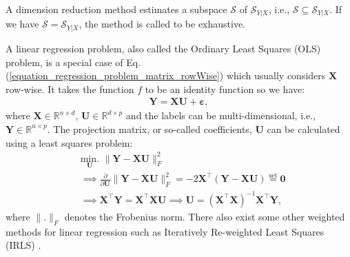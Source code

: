 \documentclass[lang=cn,10pt]{gorgeousnbook}
\numberwithin{equation}{section}%
\numberwithin{figure}{section}%
\begin{document}
\begin{definition}\label{definition_exhaustive_method}
A dimension reduction method estimates a subspace $\mathcal{S}$ of $\mathcal{S}_{Y|X}$, i.e., $\mathcal{S} \subseteq \mathcal{S}_{Y|X}$. If we have $\mathcal{S} = \mathcal{S}_{Y|X}$, the method is called to be exhaustive.
\end{definition}

\begin{definition}\label{definition_linear_regression}
A linear regression problem, also called the Ordinary Least Squares (OLS) problem, is a special case of Eq. (\ref{equation_regression_problem_matrix_rowWise}) which usually considers $\boldsymbol{X}$ row-wise. It takes the function $f$ to be an identity function so we have:
\begin{align*}
\boldsymbol{Y} = \boldsymbol{X} \boldsymbol{U} + \boldsymbol{\varepsilon},
\end{align*}
where $\boldsymbol{X} \in \mathbb{R}^{n \times d}$, $\boldsymbol{U} \in \mathbb{R}^{d \times p}$ and the labels can be multi-dimensional, i.e., $\boldsymbol{Y} \in \mathbb{R}^{n \times p}$. 
The projection matrix, or so-called coefficients, $\boldsymbol{U}$ can be calculated using a least squares problem:
\begin{align}
&\underset{\boldsymbol{U}}{\text{min.}}\,\, \|\boldsymbol{Y} - \boldsymbol{X} \boldsymbol{U}\|_F^2 \nonumber\\
&\implies \frac{\partial }{\partial \boldsymbol{U}}  \|\boldsymbol{Y} - \boldsymbol{X} \boldsymbol{U}\|_F^2 = -2\boldsymbol{X}^\top(\boldsymbol{Y} - \boldsymbol{X} \boldsymbol{U}) \overset{\text{set}}{=} \boldsymbol{0} \nonumber\\
&\implies \boldsymbol{X}^\top \boldsymbol{Y} = \boldsymbol{X}^\top \boldsymbol{X} \boldsymbol{U} \implies \boldsymbol{U} = (\boldsymbol{X}^\top \boldsymbol{X})^{-1} \boldsymbol{X}^\top \boldsymbol{Y}, \label{equation_linear_regression_U_matrix}
\end{align}
where $\|.\|_F$ denotes the Frobenius norm.
There also exist some other weighted methods for linear regression such as Iteratively Re-weighted Least Squares (IRLS) \cite{chartrand2008iteratively}.
\end{definition}
\end{document}
